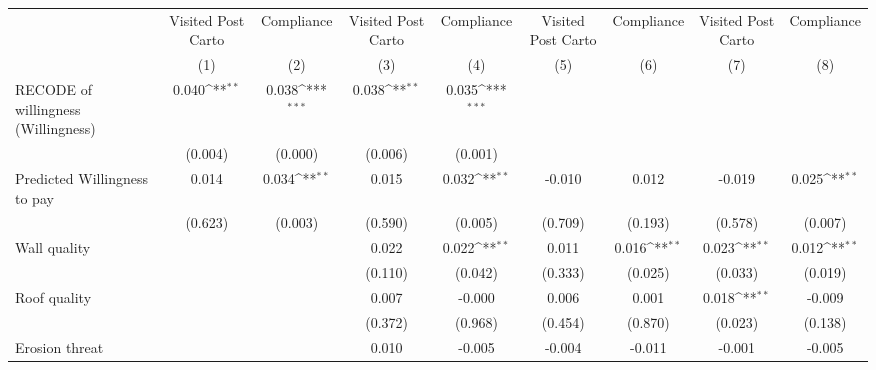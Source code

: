 {
\def\sym#1{\ifmmode^{#1}\else\(^{#1}\)\fi}
\begin{tabular}{l*{8}{c}}
\toprule
                &\multicolumn{1}{c}{Visited Post Carto}&\multicolumn{1}{c}{Compliance}&\multicolumn{1}{c}{Visited Post Carto}&\multicolumn{1}{c}{Compliance}&\multicolumn{1}{c}{Visited Post Carto}&\multicolumn{1}{c}{Compliance}&\multicolumn{1}{c}{Visited Post Carto}&\multicolumn{1}{c}{Compliance}\\
                &\multicolumn{1}{c}{(1)}         &\multicolumn{1}{c}{(2)}         &\multicolumn{1}{c}{(3)}         &\multicolumn{1}{c}{(4)}         &\multicolumn{1}{c}{(5)}         &\multicolumn{1}{c}{(6)}         &\multicolumn{1}{c}{(7)}         &\multicolumn{1}{c}{(8)}         \\
\midrule
RECODE of willingness (Willingness)&    0.040\sym{**} &    0.038\sym{***}&    0.038\sym{**} &    0.035\sym{***}&                  &                  &                  &                  \\
                &  (0.004)         &  (0.000)         &  (0.006)         &  (0.001)         &                  &                  &                  &                  \\
Predicted Willingness to pay&    0.014         &    0.034\sym{**} &    0.015         &    0.032\sym{**} &   -0.010         &    0.012         &   -0.019         &    0.025\sym{**} \\
                &  (0.623)         &  (0.003)         &  (0.590)         &  (0.005)         &  (0.709)         &  (0.193)         &  (0.578)         &  (0.007)         \\
Wall quality    &                  &                  &    0.022         &    0.022\sym{**} &    0.011         &    0.016\sym{**} &    0.023\sym{**} &    0.012\sym{**} \\
                &                  &                  &  (0.110)         &  (0.042)         &  (0.333)         &  (0.025)         &  (0.033)         &  (0.019)         \\
Roof quality    &                  &                  &    0.007         &   -0.000         &    0.006         &    0.001         &    0.018\sym{**} &   -0.009         \\
                &                  &                  &  (0.372)         &  (0.968)         &  (0.454)         &  (0.870)         &  (0.023)         &  (0.138)         \\
Erosion threat  &                  &                  &    0.010         &   -0.005         &   -0.004         &   -0.011         &   -0.001         &   -0.005         \\

\end{tabular}}
